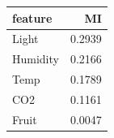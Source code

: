 \begin{tabular}{lr}
\toprule
feature & MI \\
\midrule
Light & 0.2939 \\
Humidity & 0.2166 \\
Temp & 0.1789 \\
CO2 & 0.1161 \\
Fruit & 0.0047 \\
\bottomrule
\end{tabular}
